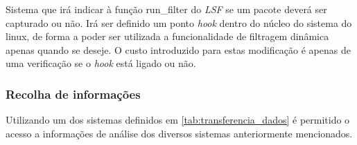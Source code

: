 Sistema que irá indicar à função run\_filter do \textit{LSF} se um pacote deverá
ser capturado ou não. Irá ser definido um ponto \textit{hook} dentro do núcleo
do sistema do linux, de forma a poder ser utilizada a funcionalidade de
filtragem dinâmica apenas quando se deseje. O custo introduzido para estas
modificação é apenas de uma verificação se o \textit{hook} está ligado ou não.


\subsubsection{Recolha de informações}

Utilizando um dos sistemas definidos em \ref{tab:transferencia_dados} é
permitido o acesso a informações de análise dos diversos sistemas anteriormente
mencionados.



